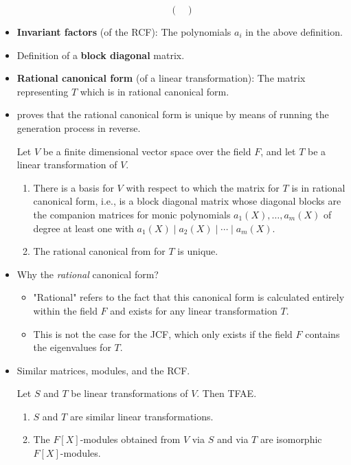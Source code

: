 \documentclass[../notes.tex]{subfiles}
\begin{document}
\begin{itemize}
\begin{equation*}
\begin{pmatrix}
        \end{pmatrix}
    \end{equation*}
    \item \textbf{Invariant factors} (of the RCF): The polynomials $a_i$ in the above definition.
    \item Definition of a \textbf{block diagonal} matrix.
    \item \textbf{Rational canonical form} (of a linear transformation): The matrix representing $T$ which is in rational canonical form.
    \item \textcite{bib:DummitFoote} proves that the rational canonical form is unique by means of running the generation process in reverse.
    \begin{theorem}\label{trm:12.14}
        Let $V$ be a finite dimensional vector space over the field $F$, and let $T$ be a linear transformation of $V$.
        \begin{enumerate}
            \item There is a basis for $V$ with respect to which the matrix for $T$ is in rational canonical form, i.e., is a block diagonal matrix whose diagonal blocks are the companion matrices for monic polynomials $a_1(X),\dots,a_m(X)$ of degree at least one with $a_1(X)\mid a_2(X)\mid\cdots\mid a_m(X)$.
            \item The rational canonical from for $T$ is unique.
        \end{enumerate}
    \end{theorem}
    \item Why the \emph{rational} canonical form?
    \begin{itemize}
        \item "Rational" refers to the fact that this canonical form is calculated entirely within the field $F$ and exists for any linear transformation $T$.
        \item This is not the case for the JCF, which only exists if the field $F$ contains the eigenvalues for $T$.
    \end{itemize}
    \item Similar matrices, modules, and the RCF.
    \begin{theorem}\label{trm:12.15}
        Let $S$ and $T$ be linear transformations of $V$. Then TFAE.
        \begin{enumerate}
            \item $S$ and $T$ are similar linear transformations.
            \item The $F[X]$-modules obtained from $V$ via $S$ and via $T$ are isomorphic $F[X]$-modules.

\end{enumerate}
\end{theorem}
\end{itemize}
\end{document}
